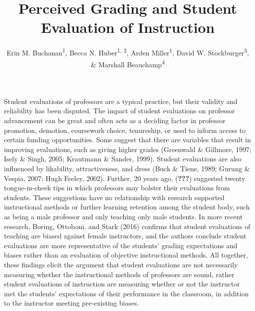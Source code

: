 \documentclass[,man]{apa6}
\title{Perceived Grading and Student Evaluation of Instruction}
\author{Erin M. Buchanan\textsuperscript{1}, Becca N.
Huber\textsuperscript{1, 2}, Arden Miller\textsuperscript{1}, David W.
Stockburger\textsuperscript{3}, \& Marshall Beauchamp\textsuperscript{4}}
\date{}
\affiliation{
\vspace{0.5cm}
\textsuperscript{1} Missouri State University\\\textsuperscript{2} Idaho State University\\\textsuperscript{3} US Air Force Academy\\\textsuperscript{4} University of Missouri - Kansas City}
\theoremstyle{definition}
\theoremstyle{definition}
\theoremstyle{definition}
\theoremstyle{remark}
\begin{document}
\maketitle

Student evaluations of professors are a typical practice, but their
validity and reliability has been disputed. The impact of student
evaluations on professor advancement can be great and often acts as a
deciding factor in professor promotion, demotion, coursework choice,
tenureship, or used to inform access to certain funding opportunities.
Some suggest that there are variables that result in improving
evaluations, such as giving higher grades (Greenwald \& Gillmore, 1997;
Isely \& Singh, 2005; Krautmann \& Sander, 1999). Student evaluations
are also influenced by likability, attractiveness, and dress (Buck \&
Tiene, 1989; Gurung \& Vespia, 2007; Hugh Feeley, 2002). Further, 20
years ago, ({\textbf{???}}) suggested twenty tongue-in-cheek tips in
which professors may bolster their evaluations from students. These
suggestions have no relationship with research supported instructional
methods or further learning retention among the student body, such as
being a male professor and only teaching only male students. In more
recent research, Boring, Ottoboni, and Stark (2016) confirms that
student evaluations of teaching are biased against female instructors,
and the authors conclude student evaluations are more representative of
the students' grading expectations and biases rather than an evaluation
of objective instructional methods. All together, these findings elicit
the argument that student evaluations are not necessarily measuring
whether the instructional methods of professors are sound, rather
student evaluations of instruction are measuring whether or not the
instructor met the students' expectations of their performance in the
classroom, in addition to the instructor meeting pre-existing biases.
\end{document}
